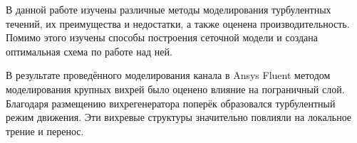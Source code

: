 
В данной работе изучены различные методы моделирования турбулентных течений, их преимущества и недостатки, а также оценена производительность. Помимо этого изучены способы построения сеточной модели и создана оптимальная схема по работе над ней.

В результате проведённого моделирования канала в Ansys Fluent методом моделирования крупных вихрей было оценено влияние на пограничный слой. Благодаря размещению вихрегенератора поперёк образовался турбулентный режим движения. Эти вихревые структуры значительно повлияли на локальное трение и перенос.  